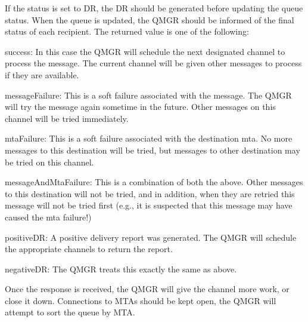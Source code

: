 If the status is set to DR, the DR should be generated before updating
the queue status.  When the queue is updated, the QMGR should be
informed of the final status of each recipient.  The returned value is
one of the following:
\begin{describe}
\item[success:] In this case the QMGR will schedule the next
designated channel to process the message. The current channel will be
given other messages to process if they are available.

\item[messageFailure:] This is a soft failure associated with the
message. The QMGR will try the message again sometime in the future.
Other messages on this channel will be tried immediately.

\item[mtaFailure:] This is a soft failure associated with the
destination mta. No more messages to this destination will be tried,
but messages to other destination may be tried on this channel.

\item[messageAndMtaFailure:] This is a combination of both the above.
Other messages to this destination will not be tried, and in addition,
when they are retried this message will not be tried first (e.g., it
is suspected that this message may have caused the mta failure!)

\item[positiveDR:] A positive delivery report was generated. The QMGR
will schedule the appropriate channels to return the report.

\item[negativeDR:] The QMGR treats this exactly the same as above.
\end{describe}

Once the response is received, the QMGR will give the channel
more work, or close it down.  Connections to MTAs should be kept open,
the QMGR will attempt to sort the queue by MTA.

